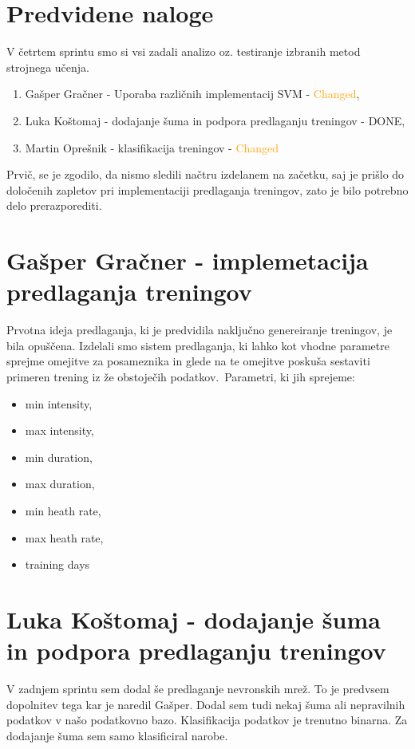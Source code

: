 \documentclass[a4paper,11pt]{article}
\begin{document}
\section{Predvidene naloge}
V četrtem sprintu smo si vsi zadali analizo oz. testiranje izbranih metod strojnega učenja.
	\begin{enumerate}
		\item{Gašper Gračner - Uporaba različnih implementacij SVM - \textcolor{Orange}{Changed}, }
		\item{Luka Koštomaj - dodajanje šuma in podpora predlaganju treningov - \textcolor{OliveGreen}{DONE}, }
		\item{Martin Oprešnik - klasifikacija treningov - \textcolor{Orange}{Changed}}
	\end{enumerate}
Prvič, se je zgodilo, da nismo sledili načtru izdelanem na začetku, saj je prišlo do določenih zapletov pri implementaciji predlaganja treningov, zato je bilo potrebno delo prerazporediti.
	

\newpage
\section{Gašper Gračner - implemetacija predlaganja treningov}
Prvotna ideja predlaganja, ki je predvidila naključno genereiranje treningov, je bila opuščena. Izdelali smo sistem predlaganja, ki lahko kot vhodne parametre sprejme omejitve za posameznika in glede na te omejitve poskuša sestaviti primeren trening iz že obstoječih podatkov.\
Parametri, ki jih sprejeme:
\begin{itemize}
	\item{min intensity,}
	\item{max intensity,}
	\item{min duration,}
	\item{max duration,}
	\item{min heath rate,}
	\item{max heath rate,}
	\item{training days}
\end{itemize}

\section{Luka Koštomaj - dodajanje šuma in podpora predlaganju treningov}
V zadnjem sprintu sem dodal še predlaganje nevronskih mrež. To je predvsem dopolnitev tega kar je naredil Gašper. Dodal sem tudi nekaj šuma ali nepravilnih podatkov v našo podatkovno bazo. Klasifikacija podatkov je trenutno binarna. Za dodajanje šuma sem samo klasificiral narobe.
\end{document}
